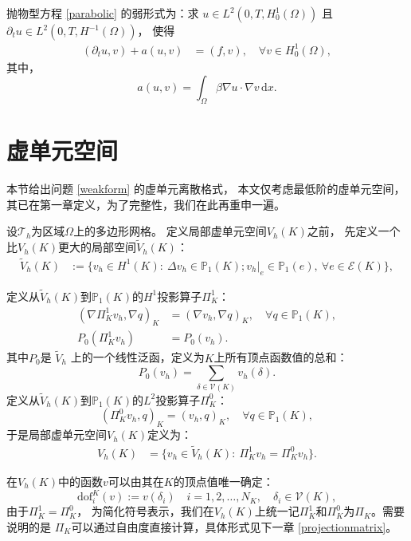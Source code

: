 抛物型方程 \eqref{parabolic} 的弱形式为：求 $u \in L^2(0, T, H^1_0(\Omega))$ 且
$\partial_t u \in L^2(0, T, H^{-1}(\Omega))$，
使得
\begin{equation}
\label{weakform}
\begin{aligned}
    (\partial_t u, v) + a(u, v) & = (f, v), \quad \forall v \in H^1_0(\Omega),
\end{aligned}
\end{equation}
其中，
$$
a(u, v) = \int_{\Omega} \beta \nabla u \cdot \nabla v \,\mathrm{d}x.
$$
\section{虚单元空间}
本节给出问题 \eqref{weakform} 的虚单元离散格式，
本文仅考虑最低阶的虚单元空间，其已在第一章定义，为了完整性，我们在此再重申一遍。

设$\mathcal{T}_h$为区域$\Omega$上的多边形网格。
定义局部虚单元空间$V_h(K)$之前，
先定义一个比$V_h(K)$更大的局部空间$\tilde{V}_h(K)$：
\begin{align}
\tilde{V}_h(K) & := \{ v_h \in H^1(K) : ~ \Delta v_h \in \mathbb{P}_1(K); v_h|_e\in\mathbb{P}_1(e), ~ \forall e \in
\mathcal{E}(K) \},  
\label{biggervespace}
\end{align}

定义从$\tilde{V}_h(K)$到$\mathbb{P}_1(K)$的$H^1$投影算子$\Pi_K^1$：
\begin{equation}
\label{h1projection}
\begin{aligned}
(\nabla\Pi_K^1 v_h, \nabla q)_{K} & = (\nabla v_h, \nabla q)_{K}, \quad \forall
q \in \mathbb{P}_1(K),\\
P_0(\Pi_K^1 v_h) & = P_0(v_h).
\end{aligned}
\end{equation}
其中$P_0$是 $\tilde{V}_h$ 上的一个线性泛函，定义为$K$上所有顶点函数值的总和：
$$
P_0(v_h) = \sum_{\delta \in \mathcal{V}(K)} v_h (\delta).
$$
定义从$\tilde{V}_h(K)$到$\mathbb{P}_1(K)$的$L^2$投影算子$\Pi_K^0$：
$$
(\Pi_K^0 v_h, q)_{K} = (v_h, q)_{K}, \quad \forall q \in \mathbb{P}_1(K),
$$
于是局部虚单元空间$V_h(K)$定义为：
\begin{align}
    V_h(K) & = \{ v_h \in \tilde{V}_h(K) : ~ \Pi_K^1 v_h = \Pi_K^0 v_h \}.
\end{align}

在$V_h(K)$中的函数$v$可以由其在$K$的顶点值唯一确定：
$$
\mathrm{dof}_i^K(v) := v(\delta_i) \quad i = 1, 2, \dots, N_K, \quad \delta_i
\in \mathcal{V}(K),
$$
由于$\Pi_K^1 = \Pi_K^0$，
为简化符号表示，我们在$V_h(K)$上统一记$\Pi_K^1$和$\Pi_K^0$为$\Pi_K$。需要说明的是
$\Pi_K$可以通过自由度直接计算，具体形式见下一章 \ref{projectionmatrix}。

